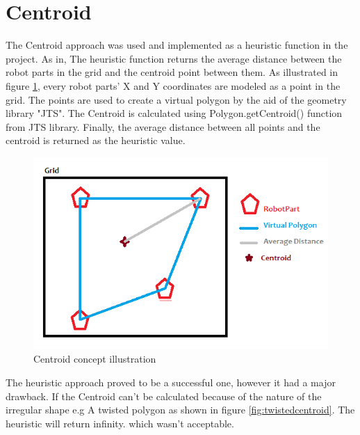 \section{Centroid}

The Centroid approach was used and implemented as a heuristic function in the project. As in, The heuristic function returns the average distance between the robot parts in the grid and the centroid point between them. As illustrated in figure \ref{fig:centroid_model}, every robot parts' X and Y coordinates are modeled as a point in the grid. The points are used to create a virtual polygon by the aid of the geometry library "JTS". The Centroid is calculated using Polygon.getCentroid() function from JTS library. Finally, the average distance between all points and the centroid is returned as the heuristic value.

\begin{figure}[H] 
   	\centering
	\includegraphics[scale=0.6]{images/Centroid} 
    \caption{Centroid concept illustration}
    \label{fig:centroid_model} 
\end{figure}

The heuristic approach proved to be a successful one, however it had a major drawback. If the Centroid can't be calculated because of the nature of the irregular shape e.g A twisted polygon as shown in figure \ref{fig:twistedcentroid}. The heuristic will return infinity. which wasn't acceptable. 

